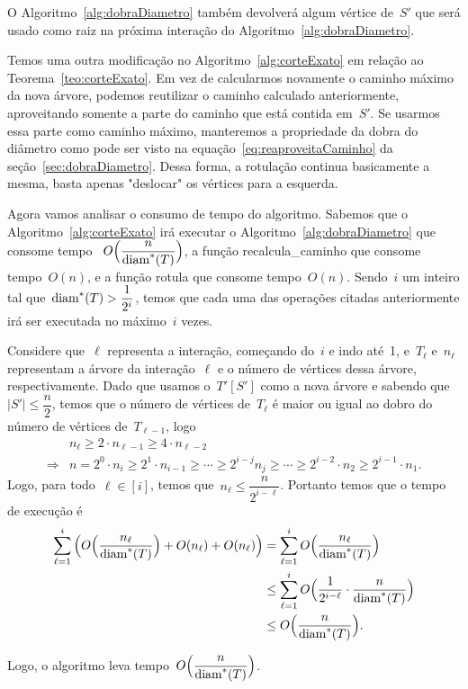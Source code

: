 		O Algoritmo~\ref{alg:dobraDiametro} também devolverá 
		algum vértice de~$S'$ que será usado como raiz na 
		próxima interação do Algoritmo~\ref{alg:dobraDiametro}.

		Temos uma outra modificação no Algoritmo~\ref{alg:corteExato}   
		em relação ao Teorema~\ref{teo:corteExato}.
		Em vez de calcularmos novamente o caminho máximo da nova
		árvore, podemos reutilizar o caminho calculado anteriormente,
		aproveitando somente a parte do caminho que está contida 
		em~$S'$. 
		Se usarmos essa parte como caminho máximo,
		manteremos a propriedade da dobra do diâmetro como pode
		ser visto na equação~\ref{eq:reaproveitaCaminho} da 
		seção~\ref{sec:dobraDiametro}. 
		Dessa forma, a rotulação continua basicamente a mesma,
		basta apenas "deslocar" os vértices para a esquerda.

		\bigskip

		Agora vamos analisar o consumo de tempo do algoritmo.
		Sabemos que o Algoritmo~\ref{alg:corteExato} irá executar
		o Algoritmo~\ref{alg:dobraDiametro} que consome 
		tempo ~${O\Big(\dfrac{n}{\mathrm{diam}^*(T)}\Big)}$, a função
		{\sc recalcula\_caminho} que consome tempo~$O(n)$, e a função
		{\sc rotula} que consome tempo~$O(n)$.
		Sendo~$i$ um inteiro tal que~$\mathrm{diam}^*(T)>\dfrac{1}{2^i}$, 
		temos que cada uma das operações citadas anteriormente
		irá ser executada no máximo~$i$ vezes.

		Considere que~$\ell$ representa a interação,
		começando do~$i$ e indo até~1, e~$T_\ell$ e~$n_\ell$ 
		representam a árvore da interação~$\ell$ e
		o número de vértices dessa árvore, respectivamente.
		Dado que usamos o~$T'[S']$ como a nova árvore
		e sabendo que~$|S'|\le \dfrac{n}{2}$,
		temos que o número de vértices de~$T_{\ell}$
		é maior ou igual ao 
		dobro do número de vértices de~$T_{\ell-1}$, logo
		\begin{align}
			 & n_{\ell} \ge 2\cdot n_{\ell-1} \ge 4\cdot n_{\ell-2} \nonumber\\
			\Rightarrow & n = 2^0\cdot n_i\ge 2^1\cdot n_{i-1} \ge\cdots\ge
			2^{i-j}n_j\ge\cdots\ge
			 2^{i-2}\cdot n_{2}\ge 2^{i-1}\cdot n_1. \nonumber 
		\end{align}
		Logo, para todo~$\ell\in[i]$, temos que~$n_\ell \le\dfrac{n} {2^{i-\ell}}$.
		Portanto temos que o tempo de execução é
		\begin{align}
			\displaystyle\sum_{\ell=1}^{i} \Big(O\Big(\dfrac{n_\ell}{\mathrm{diam}^*(T)}\Big)
			+ O(n_\ell) + O(n_\ell)\Big)
			&= \displaystyle\sum_{\ell=1}^{i} O\Big(\dfrac{n_\ell}{\mathrm{diam}^*(T)}\Big) \nonumber\\
			&\le \displaystyle\sum_{\ell=1}^{i} O\Big(\dfrac{1}{2^{i-\ell}}
			\cdot\dfrac{n}{\mathrm{diam}^*(T)}\Big) \nonumber\\
			&\le O\Big(\dfrac{n}{\mathrm{diam}^*(T)}\Big). \nonumber
		\end{align}

		Logo, o algoritmo leva tempo~$O\Big(\dfrac{n}{\mathrm{diam}^*(T)}\Big)$.

